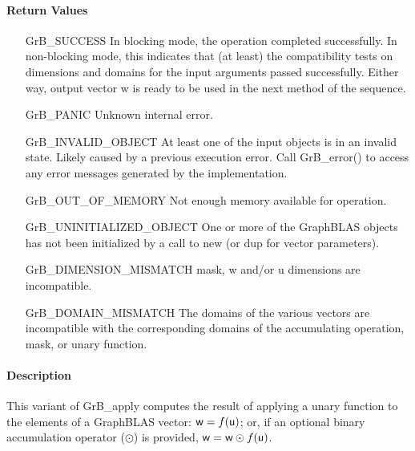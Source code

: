 \paragraph{Return Values}

\begin{itemize}[leftmargin=2.1in]
    \item[{\sf GrB\_SUCCESS}]         In blocking mode, the operation completed
	    successfully. In non-blocking mode, this indicates that (at least) the compatibility 
    tests on dimensions and domains for the input arguments passed successfully. 
    Either way, output vector {\sf w} is ready to be used in the next method of 
    the sequence.

    \item[{\sf GrB\_PANIC}]            Unknown internal error.
    
    \item[{\sf GrB\_INVALID\_OBJECT}] At least one of the input objects is
	    in an invalid state. Likely caused by a previous execution error.
    Call {\sf GrB\_error()} to access 
    any error messages generated by the implementation.

    \item[{\sf GrB\_OUT\_OF\_MEMORY}]  Not enough memory available for operation.
    
    \item[{\sf GrB\_UNINITIALIZED\_OBJECT}] One or more of the GraphBLAS objects 
    has not been initialized by a call to {\sf new} (or {\sf dup} for vector
    parameters).
    
    \item[{\sf GrB\_DIMENSION\_MISMATCH}]  {\sf mask}, {\sf w} and/or {\sf u} dimensions are
    incompatible. 
    
    \item[{\sf GrB\_DOMAIN\_MISMATCH}]    The domains of the various vectors are
	incompatible with the corresponding domains of the accumulating operation, 
    mask, or unary function.
\end{itemize}

\paragraph{Description}

This variant of {\sf GrB\_apply} computes the result of applying a unary function
to the elements of a GraphBLAS vector:
${\sf w} = f({\sf u})$; or, if an optional binary accumulation 
operator ($\odot$) is provided, ${\sf w} = {\sf w} \odot f({\sf u})$.  

